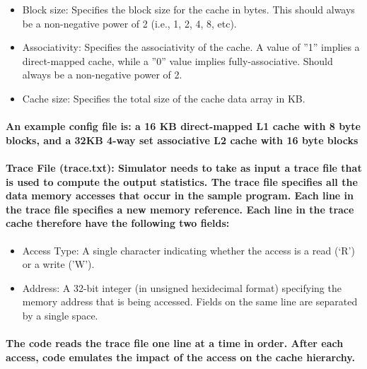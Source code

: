 \documentclass{article}
\begin{document}
 \begin{itemize}
     \item Block size: Specifies the block size for the cache in bytes.
      This should always be a non-negative power of 2 (i.e., 1, 2, 4, 8, etc).

      \item Associativity: Specifies the associativity of the cache. A value of 
      ”1” implies a direct-mapped cache, while a ”0” value implies fully-associative.
       Should always be a non-negative power of 2. 

       \item Cache size: Specifies the total size of the cache data array in KB.
        
 \end{itemize}

 \paragraph{An example config file is: a 16 KB direct-mapped L1 cache with 8 byte blocks, 
 and a 32KB 4-way set associative L2 cache with 16 byte blocks}

 \paragraph{Trace File (trace.txt): Simulator needs to take as input a trace file that
 is used to compute the output statistics. The trace file specifies all the data memory 
 accesses that occur in the sample program. Each line in the trace file specifies a new 
 memory reference. Each line in the trace cache therefore have the following two fields:}

 \begin{itemize}
     \item Access Type: A single character indicating whether the access is a read (‘R') or a write ('W').
     \item Address: A 32-bit integer (in unsigned hexidecimal format) specifying the memory address that is 
     being accessed. Fields on the same line are separated by a single space.
 \end{itemize}

 \paragraph{The code reads the trace file one line at a time in order. After each access, 
 code emulates the impact of the access on the cache hierarchy.}
\end{document}
